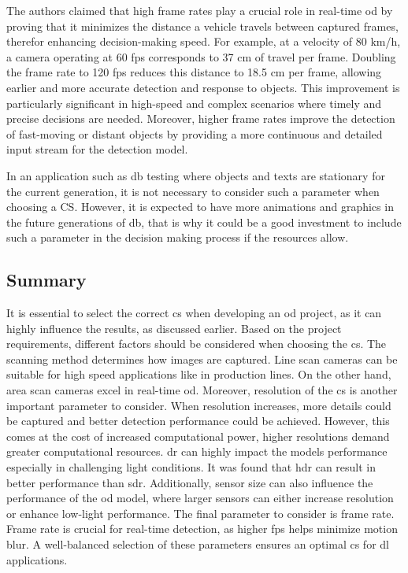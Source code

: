 The authors claimed that high frame rates play a crucial role in real-time \gls{od} by proving that it  minimizes the distance a vehicle travels between captured frames, therefor enhancing decision-making speed. For example, at a velocity of 80 km/h, a camera operating at 60 \gls{fps} corresponds to 37 cm of travel per frame. Doubling the frame rate to 120 \gls{fps} reduces this distance to 18.5 cm per frame, allowing earlier and more accurate detection and response to objects. This improvement is particularly significant in high-speed and complex scenarios where timely and precise decisions are needed. Moreover, higher frame rates improve the detection of fast-moving or distant objects by providing a more continuous and detailed input stream for the detection model.

In an application such as \gls{db} testing where objects and texts are stationary for the current generation, it is not necessary to consider such a parameter when choosing a CS. However, it is expected to have more animations and graphics in the future generations of \gls{db}, that is why it could be a good investment to include such a parameter in the decision making process if the resources allow.

\subsection{Summary}
It is essential to select the correct \gls{cs} when developing an \gls{od} project, as it can highly influence the results, as discussed earlier. Based on the project requirements, different factors should be considered when choosing the \gls{cs}. The scanning method determines how images are captured. Line scan cameras can be suitable for high speed applications like in production lines. On the other hand, area scan cameras excel in real-time \gls{od}. Moreover, resolution of the \gls{cs} is another important parameter to consider. When resolution increases, more details could be captured and better detection performance could be achieved. However, this comes at the cost of increased computational power, higher resolutions demand greater computational resources. \gls{dr} can highly impact the models performance especially in challenging light conditions. It was found that \gls{hdr} can result in better performance than \gls{sdr}. Additionally, sensor size can also influence the performance of the \gls{od} model, where larger sensors can either increase resolution or enhance low-light performance. The final parameter to consider is frame rate. Frame rate is crucial for real-time detection, as higher \gls{fps} helps minimize motion blur. A well-balanced selection of these parameters ensures an optimal \gls{cs} for \gls{dl} applications.

